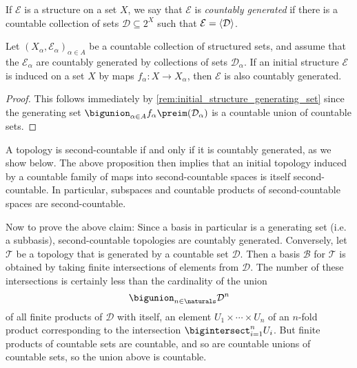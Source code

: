 \documentclass[article, a4paper, 11pt, oneside]{memoir}
\numberwithin{equation}{chapter}
\newcommand{\calT}{\mathcal{T}}
\newcommand{\calB}{\mathcal{B}}
\newcommand{\calE}{\mathcal{E}}
\newcommand{\calD}{\mathcal{D}}
\DeclarePairedDelimiter{\gen}{\langle}{\rangle} %
\begin{document}
If $\calE$ is a structure on a set $X$, we say that $\calE$ is \emph{countably generated} if there is a countable collection of sets $\calD \subseteq 2^X$ such that $\calE = \gen{\calD}$.

\begin{proposition}
    Let $(X_\alpha,\calE_\alpha)_{\alpha \in A}$ be a countable collection of structured sets, and assume that the $\calE_\alpha$ are countably generated by collections of sets $\calD_\alpha$. If an initial structure $\calE$ is induced on a set $X$ by maps $f_\alpha \colon X \to X_\alpha$, then $\calE$ is also countably generated.
\end{proposition}

\begin{proof}
    This follows immediately by \cref{rem:initial_structure_generating_set} since the generating set $\bigunion_{\alpha \in A} f_\alpha\preim(\calD_\alpha)$ is a countable union of countable sets.
\end{proof}


\begin{examplebreak}
    \label{ex:second_countable_space}
    A topology is second-countable if and only if it is countably generated, as we show below. The above proposition then implies that an initial topology induced by a countable family of maps into second-countable spaces is itself second-countable. In particular, subspaces and countable products of second-countable spaces are second-countable.
    
    Now to prove the above claim: Since a basis in particular is a generating set (i.e. a subbasis), second-countable topologies are countably generated. Conversely, let $\calT$ be a topology that is generated by a countable set $\calD$. Then a basis $\calB$ for $\calT$ is obtained by taking finite intersections of elements from $\calD$. The number of these intersections is certainly less than the cardinality of the union
    \begin{equation*}
        \bigunion_{n \in \naturals} \calD^n
    \end{equation*}
    of all finite products of $\calD$ with itself, an element $U_1 \times \cdots \times U_n$ of an $n$-fold product corresponding to the intersection $\bigintersect_{i=1}^n U_i$. But finite products of countable sets are countable, and so are countable unions of countable sets, so the union above is countable.
\end{examplebreak}
\end{document}
